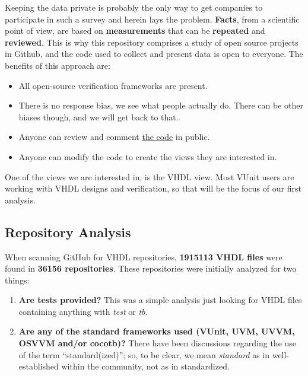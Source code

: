 \documentclass[]{article}
\providecommand{\tightlist}{%
  \setlength{\itemsep}{0pt}\setlength{\parskip}{0pt}}
\begin{document}
Keeping the data private is probably the only way to get companies to participate in such a survey and herein lays the problem. \textbf{Facts}, from a scientific point of view, are based on \textbf{measurements} that can be \textbf{repeated} and \textbf{reviewed}. This is why this repository comprises a study of open source projects in Github, and the code used to collect and present data is open to everyone. The benefits of this approach are:

\begin{itemize}
\tightlist
\item
  All open-source verification frameworks are present.
\item
  There is no response bias, we see what people actually do. There can be other biases though, and we will get back to that.
\item
  Anyone can review and comment \href{https://github.com/LarsAsplund/github-facts/tree/main/py}{the code} in public.
\item
  Anyone can modify the code to create the views they are interested in.
\end{itemize}

One of the views we are interested in, is the VHDL view. Most VUnit users are working with VHDL designs and verification, so that will be the focus of our first analysis.

\hypertarget{repository-analysis}{%
\subsection{Repository Analysis}\label{repository-analysis}}

When scanning GitHub for VHDL repositories, \textbf{1915113 VHDL files} were found in \textbf{36156 repositories}. These repositories were initially analyzed for two things:

\begin{enumerate}
\def\labelenumi{\arabic{enumi}.}
\tightlist
\item
  \textbf{Are tests provided?} This was a simple analysis just looking for VHDL files containing anything with \emph{test} or \emph{tb}.
\item
  \textbf{Are any of the standard frameworks used (VUnit, UVM, UVVM, OSVVM and/or cocotb)?} There have been discussions regarding the use of the term ``standard(ized)''; so, to be clear, we mean \emph{standard} as in well-established within the community, not as in standardized.
\end{enumerate}
\end{document}
